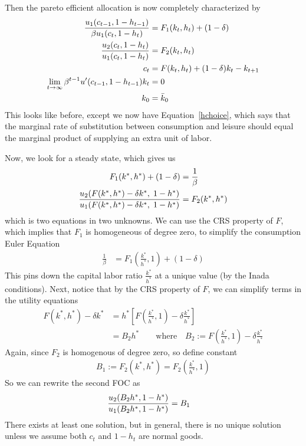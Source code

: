 \documentclass[12pt]{article}
\theoremstyle{plain}
\theoremstyle{definition}
\theoremstyle{remark}
\newcommand{\limt}{\lim_{t\rightarrow\infty}}
\begin{document}
Then the pareto efficient allocation is now completely characterized by
\begin{align}
  \frac{u_1(c_{t-1},1-h_{t-1})}{\beta u_1(c_{t},1-h_t)}
    &= F_1(k_t,h_t) + (1-\delta) \notag \\
  \frac{u_2(c_t,1-h_t)}{u_1(c_t,1-h_t)}
    &= F_2(k_t,h_t) \label{hchoice}\\
  c_t &= F(k_t,h_t) + (1-\delta)k_t - k_{t+1}\notag\\
  \limt \beta^{t-1}u'(c_{t-1},1-h_{t-1}) k_t &= 0 \notag\\
  k_0 &= \bar{k}_0\notag
\end{align}
This looks like before, except we now have Equation~\ref{hchoice}, which
says that the marginal rate of substitution between consumption and
leisure should equal the marginal product of supplying an extra unit of
labor.

Now, we look for a steady state, which gives us
\begin{align}
  F_1(k^*,h^*) + (1-\delta)
    &= \frac{1}{\beta} \notag \\
  \frac{u_2(F(k^*,h^*) - \delta k^*,\; 1-h^*)}{%
    u_1(F(k^*,h^*) - \delta k^*,\;1-h^*)}
    &= F_2(k^*,h^*) \notag
\end{align}
which is two equations in two unknowns. We can use the CRS property of
$F$, which implies that $F_1$ is homogeneous of degree zero, to simplify
the consumption Euler Equation
\begin{align*}
  \frac{1}{\beta}
    &= F_1\left(\frac{k^*}{h^*},1\right) + (1-\delta)
\end{align*}
This pins down the capital labor ratio $\frac{k^*}{h^*}$ at a unique
value (by the Inada conditions). Next, notice that by the CRS property
of $F$, we can simplify terms in the utility equations
\begin{align*}
  F(k^*,h^*) - \delta k^*
  &= h^*\left[F\left(\frac{k^*}{h^*},1\right) - \delta \frac{k^*}{h^*}\right] \\
  &= B_2h^*
  \qquad \text{where} \quad
  B_2:= F\left(\frac{k^*}{h^*},1\right) - \delta \frac{k^*}{h^*}
\end{align*}
Again, since $F_2$ is homogenous of degree zero, so define constant
\begin{align*}
  B_1
  :=
  F_2(k^*,h^*)
  =
  F_2\left(\frac{k^*}{h^*},1\right)
\end{align*}
So we can rewrite the second FOC as
\begin{align*}
  \frac{u_2(B_2h^*,1-h^*)}{%
    u_1(B_2h^*,1-h^*)}
    &= B_1 \notag
\end{align*}
There exists at least one solution, but in general, there is no unique
solution unless we assume both $c_t$ and $1-h_t$ are normal goods.
\end{document}
